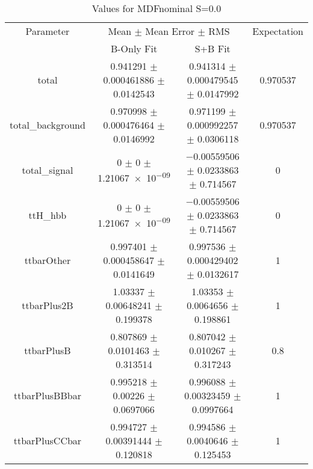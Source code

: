 \begin{table}
\centering
\caption{Values for MDFnominal S=0.0}
\begin{tabular}{cccc}
\toprule
Parameter & \multicolumn{2}{c}{Mean $\pm$ Mean Error $\pm$ RMS} & Expectation\\
 & B-Only Fit & S+B Fit & \\
\midrule
total & \num{0.941291} $\pm$ \num{0.000461886} $\pm$ \num{0.0142543} & \num{0.941314} $\pm$ \num{0.000479545} $\pm$ \num{0.0147992} & \num{0.970537}\\
total\_background & \num{0.970998} $\pm$ \num{0.000476464} $\pm$ \num{0.0146992} & \num{0.971199} $\pm$ \num{0.000992257} $\pm$ \num{0.0306118} & \num{0.970537}\\
total\_signal & \num{0} $\pm$ \num{0} $\pm$ \num{1.21067e-09} & \num{-0.00559506} $\pm$ \num{0.0233863} $\pm$ \num{0.714567} & \num{0}\\
ttH\_hbb & \num{0} $\pm$ \num{0} $\pm$ \num{1.21067e-09} & \num{-0.00559506} $\pm$ \num{0.0233863} $\pm$ \num{0.714567} & \num{0}\\
ttbarOther & \num{0.997401} $\pm$ \num{0.000458647} $\pm$ \num{0.0141649} & \num{0.997536} $\pm$ \num{0.000429402} $\pm$ \num{0.0132617} & \num{1}\\
ttbarPlus2B & \num{1.03337} $\pm$ \num{0.00648241} $\pm$ \num{0.199378} & \num{1.03353} $\pm$ \num{0.0064656} $\pm$ \num{0.198861} & \num{1}\\
ttbarPlusB & \num{0.807869} $\pm$ \num{0.0101463} $\pm$ \num{0.313514} & \num{0.807042} $\pm$ \num{0.010267} $\pm$ \num{0.317243} & \num{0.8}\\
ttbarPlusBBbar & \num{0.995218} $\pm$ \num{0.00226} $\pm$ \num{0.0697066} & \num{0.996088} $\pm$ \num{0.00323459} $\pm$ \num{0.0997664} & \num{1}\\
ttbarPlusCCbar & \num{0.994727} $\pm$ \num{0.00391444} $\pm$ \num{0.120818} & \num{0.994586} $\pm$ \num{0.0040646} $\pm$ \num{0.125453} & \num{1}\\
\bottomrule
\end{tabular}
\end{table}